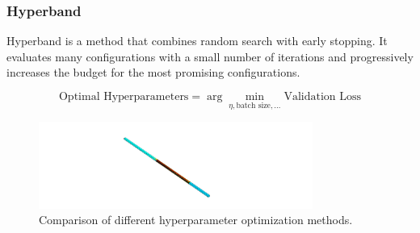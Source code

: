         \subsubsection{Hyperband}

            Hyperband is a method that combines random search with early stopping. It evaluates many configurations with a small number of iterations and progressively increases the budget for the most promising configurations.

            \begin{equation}
            \text{Optimal Hyperparameters} = \arg \min_{\eta, \text{batch size}, \ldots} \text{Validation Loss}
            \end{equation}

    \begin{figure}[h]
        \centering
        \includegraphics[width=0.8\textwidth]{00_Images/00_Velocity.png}
        \caption{Comparison of different hyperparameter optimization methods.}
        \label{fig:hyperparameter_optimization}
    \end{figure}